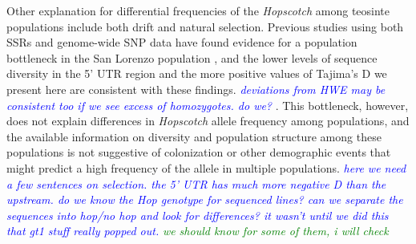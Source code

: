 \documentclass[11pt]{article}
\newcommand{\jri}[1]{\textcolor{blue}{ \emph{\scriptsize  #1}} }
\newcommand{\mbh}[1]{\textcolor{red}{ \emph{\scriptsize  #1}} }
\newcommand{\lev}[1]{\textcolor{green}{\emph{\scriptsize #1}} }
\begin{document}
\begin{linenumbers}
\begin{flushleft}
Other explanation for differential frequencies of the \emph{Hopscotch} among teosinte populations include both drift and natural selection.  Previous studies using both SSRs and genome-wide SNP data have found evidence for a population bottleneck in the San Lorenzo population \citep{Hufford2010, Pyhajarvi2013}, and the lower levels of sequence diversity in the 5' UTR region and the more positive values of Tajima's D we present here are consistent with these findings. \jri{deviations from HWE may be consistent too if we see excess of homozygotes. do we?}. This bottleneck, however, does not explain differences in \emph{Hopscotch} allele frequency among populations, and the available information on diversity and population structure among these populations \citep{Hufford2010, Pyhajarvi2013} is not suggestive of colonization or other demographic events that might predict a high frequency of the allele in multiple populations.  \jri{here we need a few sentences on selection.  the 5' UTR has much more negative D than the upstream. do we know the Hop genotype for sequenced lines? can we separate the sequences into hop/no hop and look for differences? it wasn't until we did this that gt1 stuff really popped out.} \lev{we should know for some of them, i will check}




\end{flushleft}
\end{linenumbers}
\end{document}
